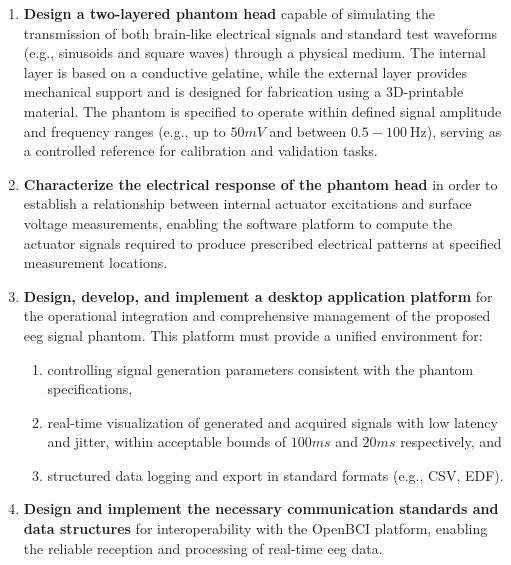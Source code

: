 \documentclass[../../00_Main/Main.tex]{subfiles}
\begin{document}
\begin{enumerate}
    \item \textbf{Design a two-layered phantom head} capable of simulating the transmission of both brain-like electrical signals and standard test waveforms (e.g., sinusoids and square waves) through a physical medium. The internal layer is based on a conductive gelatine, while the external layer provides mechanical support and is designed for fabrication using a 3D-printable material. The phantom is specified to operate within defined signal amplitude and frequency ranges (e.g., up to $50mV$ and between $0.5-100~\text{Hz}$), serving as a controlled reference for calibration and validation tasks.

    \item \textbf{Characterize the electrical response of the phantom head} in order to establish a relationship between internal actuator excitations and surface voltage measurements, enabling the software platform to compute the actuator signals required to produce prescribed electrical patterns at specified measurement locations.

    \item \textbf{Design, develop, and implement a desktop application platform} for the operational integration and comprehensive management of the proposed \gls{eeg} signal phantom. This platform must provide a unified environment for:
    \begin{enumerate}
        \item controlling signal generation parameters consistent with the phantom specifications,
        \item real-time visualization of generated and acquired signals with low latency and jitter, within acceptable bounds of $100ms$ and $20ms$ respectively, and
        \item structured data logging and export in standard formats (e.g., CSV, EDF).
    \end{enumerate}

    \item \textbf{Design and implement the necessary communication standards and data structures} for interoperability with the OpenBCI platform, enabling the reliable reception and processing of real-time \gls{eeg} data.
\end{enumerate}
\biblio~%
\end{document}
